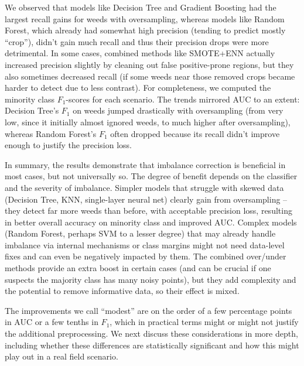 \documentclass[agriengineering,article,submit,pdftex,moreauthors]{Definitions/mdpi}
\begin{document}
We observed that models like Decision Tree and Gradient Boosting had the largest recall gains for weeds with oversampling, whereas models like Random Forest, which already had somewhat high precision (tending to predict mostly “crop”), didn’t gain much recall and thus their precision drops were more detrimental. In some cases, combined methods like SMOTE+ENN actually increased precision slightly by cleaning out false positive-prone regions, but they also sometimes decreased recall (if some weeds near those removed crops became harder to detect due to less contrast). For completeness, we computed the minority class $F_{1}$-scores for each scenario. The trends mirrored AUC to an extent: Decision Tree’s $F_{1}$ on weeds jumped drastically with oversampling (from very low, since it initially almost ignored weeds, to much higher after oversampling), whereas Random Forest’s $F_{1}$ often dropped because its recall didn’t improve enough to justify the precision loss. 

In summary, the results demonstrate that imbalance correction is beneficial in most cases, but not universally so. The degree of benefit depends on the classifier and the severity of imbalance. Simpler models that struggle with skewed data (Decision Tree, KNN, single-layer neural net) clearly gain from oversampling – they detect far more weeds than before, with acceptable precision loss, resulting in better overall accuracy on minority class and improved AUC. Complex models (Random Forest, perhaps SVM to a lesser degree) that may already handle imbalance via internal mechanisms or class margins might not need data-level fixes and can even be negatively impacted by them. The combined over/under methods provide an extra boost in certain cases (and can be crucial if one suspects the majority class has many noisy points), but they add complexity and the potential to remove informative data, so their effect is mixed.

The improvements we call “modest” are on the order of a few percentage points in AUC or a few tenths in $F_{1}$, which in practical terms might or might not justify the additional preprocessing. We next discuss these considerations in more depth, including whether these differences are statistically significant and how this might play out in a real field scenario.
\end{document}
